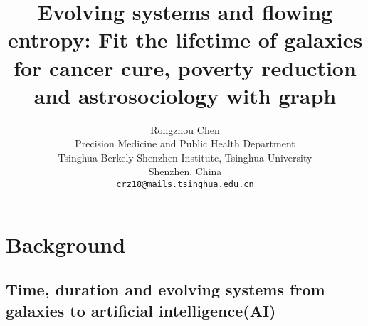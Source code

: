 \documentclass{article}
\title{Evolving systems and flowing entropy: Fit the lifetime of galaxies for cancer cure, poverty reduction and astrosociology with graph}
\author{
  Rongzhou Chen \\
  Precision Medicine and Public Health Department \\
  Tsinghua-Berkely Shenzhen Institute, Tsinghua University \\
  Shenzhen, China \\
  \texttt{crz18@mails.tsinghua.edu.cn} \\
}
\begin{document}

\maketitle
%





\glsresetall

\section{Background}
  \subsection{Time, duration and evolving systems from galaxies to artificial intelligence(AI)}
\end{document}
